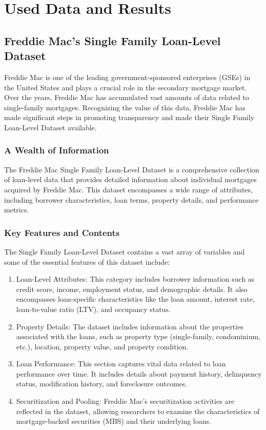 \chapter{Used Data and Results}

\section{Freddie Mac's Single Family Loan-Level Dataset}

Freddie Mac is one of the leading government-sponsored enterprises (GSEs) in the United States and plays a crucial role in the secondary mortgage market. Over the years, Freddie Mac has accumulated vast amounts of data related to single-family mortgages. Recognizing the value of this data, Freddie Mac has made significant steps in promoting transparency and made their Single Family Loan-Level Dataset available.

\subsection{A Wealth of Information}

The Freddie Mac Single Family Loan-Level Dataset is a comprehensive collection of loan-level data that provides detailed information about individual mortgages acquired by Freddie Mac. This dataset encompasses a wide range of attributes, including borrower characteristics, loan terms, property details, and performance metrics. 

\subsection{Key Features and Contents}

The Single Family Loan-Level Dataset contains a vast array of variables and some of the essential features of this dataset include:

\begin{enumerate}
\item Loan-Level Attributes: This category includes borrower information such as credit score, income, employment status, and demographic details. It also encompasses loan-specific characteristics like the loan amount, interest rate, loan-to-value ratio (LTV), and occupancy status.
\item Property Details: The dataset includes information about the properties associated with the loans, such as property type (single-family, condominium, etc.), location, property value, and property condition.
\item Loan Performance: This section captures vital data related to loan performance over time. It includes details about payment history, delinquency status, modification history, and foreclosure outcomes.
\item Securitization and Pooling: Freddie Mac's securitization activities are reflected in the dataset, allowing researchers to examine the characteristics of mortgage-backed securities (MBS) and their underlying loans.
\end{enumerate}

